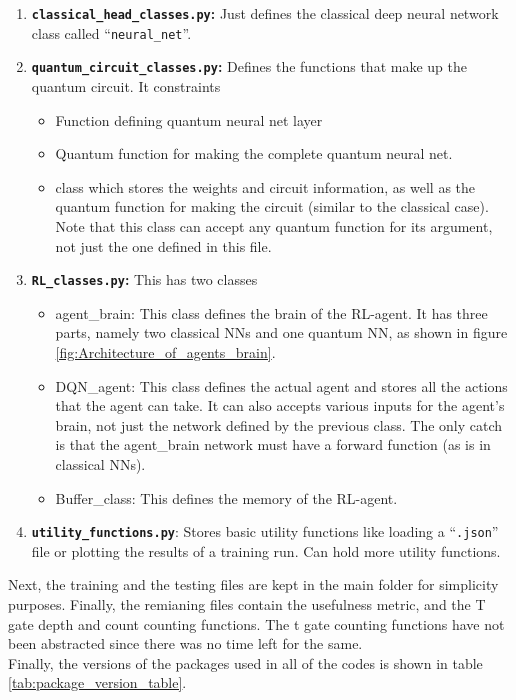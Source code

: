 \documentclass{article}
\begin{document}
\begin{enumerate}
    \item \textbf{\texttt{classical\_head\_classes.py}:} Just defines the classical deep neural network class called ``\texttt{neural\_net}''. 
    \item \textbf{\texttt{quantum\_circuit\_classes.py}:} Defines the functions that make up the quantum circuit. It constraints
    \begin{itemize}
        \item Function defining quantum neural net layer 
        \item Quantum function for making the complete quantum neural net.
        \item class which stores the weights and circuit information, as well as the quantum function for making the circuit (similar to the classical case). Note that this class can accept any quantum function for its argument, not just the one defined in this file. 
    \end{itemize}
    \item \textbf{\texttt{RL\_classes.py}:} This has two classes 
        \begin{itemize}
            \item agent\_brain: This class defines the brain of the RL-agent. It has three parts, namely two classical NNs and one quantum NN, as shown in figure \ref{fig:Architecture_of_agents_brain}.
            \item DQN\_agent: This class defines the actual agent and stores all the actions that the agent can take. It can also accepts various inputs for the agent's brain, not just the network defined by the previous class. The only catch is that the agent\_brain network must have a forward function (as is in classical NNs).  
            \item Buffer\_class: This defines the memory of the RL-agent.
        \end{itemize}  
    \item \textbf{\texttt{utility\_functions.py}}: Stores basic utility functions like loading a ``\texttt{.json}'' file or plotting the results of a training run. Can hold more utility functions.
\end{enumerate}
Next, the training and the testing files are kept in the main folder for simplicity purposes. Finally, the remianing files contain the usefulness metric, and the T gate depth and count counting functions. The t gate counting functions have not been abstracted since there was no time left for the same. \\
Finally, the versions of the packages used in all of the codes is shown in table \ref{tab:package_version_table}. 
\end{document}
